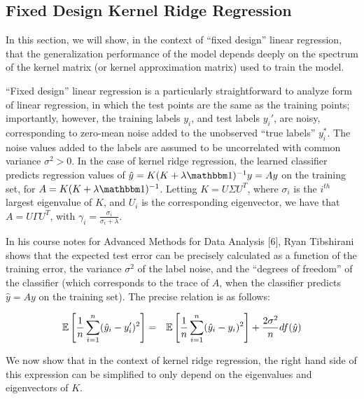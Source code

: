 \documentclass[12pt]{article}
\newcommand{\hy}{\hat{y}}
\begin{document}
\subsection{Fixed Design Kernel Ridge Regression}
\label{sec:fixed_design}
In this section, we will show, in the context of ``fixed design'' linear regression, that the generalization performance of the model depends deeply on the spectrum of the kernel matrix (or kernel approximation matrix) used to train the model.

``Fixed design'' linear regression is a particularly straightforward to analyze form of linear regression, in which the test points are the same as the training points; importantly, however, the training labels $y_i$, and test labels $y_i'$, are noisy, corresponding to zero-mean noise added to the unobserved ``true labels'' $y_i^*$. The noise values added to the labels are assumed to be uncorrelated with common variance $\sigma^2 > 0$.  In the case of kernel ridge regression, the learned classifier predicts regression values of $\hy = K(K+\lambda\id)^{-1}y = Ay$ on the training set, for $A=K(K+\lambda\id)^{-1}$.  Letting $K=U\Sigma U^T$, where $\sigma_i$ is the $i^{th}$ largest eigenvalue of $K$, and $U_i$ is the corresponding eigenvector, we have that $A = U\Gamma U^T$, with $\gamma_i = \frac{\sigma_i}{\sigma_i + \lambda}$.

In his course notes for Advanced Methods for Data Analysis [6], Ryan Tibshirani shows that the expected test error can be precisely calculated as a function of the training error, the variance $\sigma^2$ of the label noise, and the ``degrees of freedom'' of the classifier (which corresponds to the trace of $A$, when the classifier predicts $\hy = Ay$ on the training set).  The precise relation is as follows:

\begin{eqnarray*}
	\expect{}{\frac{1}{n}\sum_{i=1}^n (\hy_i - y_i')^2} &=& \expect{}{\frac{1}{n}\sum_{i=1}^n (\hy_i - y_i)^2} + \frac{2\sigma^2}{n}df(\hy)\\
\end{eqnarray*}

We now show that in the context of kernel ridge regression, the right hand side of this expression can be simplified to only depend on the eigenvalues and eigenvectors of $K$.
\end{document}

